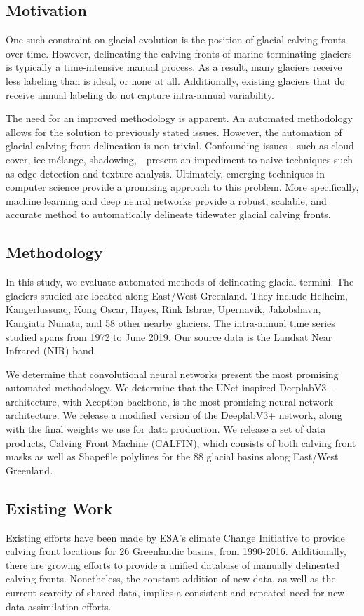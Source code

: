 \documentclass[tc, manuscript]{copernicus}
\begin{document}
\subsection{Motivation}
One such constraint on glacial evolution is the position of glacial calving fronts over time. However, delineating the calving fronts of marine-terminating glaciers is typically a time-intensive manual process. As a result, many glaciers receive less labeling than is ideal, or none at all. Additionally, existing glaciers that do receive annual labeling do not capture intra-annual variability. 

The need for an improved methodology is apparent. An automated methodology allows for the solution to previously stated issues. However, the automation of glacial calving front delineation is non-trivial. Confounding issues - such as cloud cover, ice mélange, shadowing,  - present an impediment to naive techniques such as edge detection and texture analysis. Ultimately, emerging techniques in computer science provide a promising approach to this problem. More specifically, machine learning and deep neural networks provide a robust, scalable, and accurate method to automatically delineate tidewater glacial calving fronts.

\subsection{Methodology}
In this study, we evaluate automated methods of delineating glacial termini. The glaciers studied are located along East/West Greenland. They include Helheim, Kangerlussuaq, Kong Oscar, Hayes, Rink Isbrae, Upernavik, Jakobshavn, Kangiata Nunata, and 58 other nearby glaciers. The intra-annual time series studied spans from 1972 to June 2019. Our source data is the Landsat Near Infrared (NIR) band.

We determine that convolutional neural networks present the most promising automated methodology. We determine that the UNet-inspired DeeplabV3+ architecture, with Xception backbone, is the most promising neural network architecture. We release a modified version of the DeeplabV3+ network, along with the final weights we use for data production. We release a set of data products, Calving Front Machine (CALFIN), which consists of both calving front masks as well as Shapefile polylines for the 88 glacial basins along East/West Greenland.

\subsection{Existing Work}
Existing efforts have been made by ESA's climate Change Initiative to provide calving front locations for 26 Greenlandic basins, from 1990-2016\citep{enveo2017}. Additionally, there are growing efforts to provide a unified database of manually delineated calving fronts. Nonetheless, the constant addition of new data, as well as the current scarcity of shared data, implies a consistent and repeated need for new data assimilation efforts.
\end{document}
